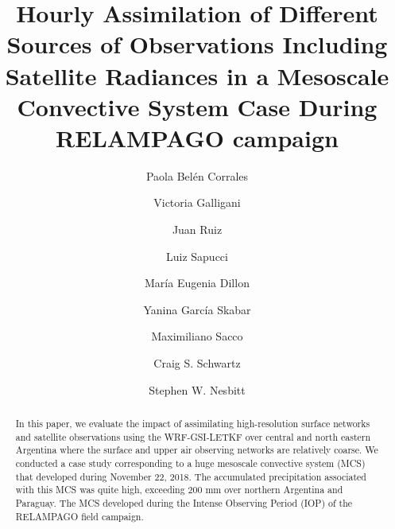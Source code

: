 \documentclass[final,5p,times,twocolumn,authoryear]{elsarticle} %
\begin{document}
\begin{frontmatter}

  \title{Hourly Assimilation of Different Sources of Observations Including Satellite Radiances in a Mesoscale Convective System Case During RELAMPAGO campaign}
    \author[UBA,CIMA,CNRS]{Paola Belén Corrales}
    \author[UBA,CIMA,CNRS]{Victoria Galligani}
  
    \author[UBA,CIMA,CNRS]{Juan Ruiz}
  
    \author[INPE]{Luiz Sapucci}
  
    \author[SMN,CONICET]{María Eugenia Dillon}
  
    \author[SMN,CONICET,CNRS]{Yanina García Skabar}
  
    \author[SMN]{Maximiliano Sacco}
  
    \author[NCAR]{Craig S. Schwartz}
  
    \author[Illinois]{Stephen W. Nesbitt}
  
      \address[UBA]{Universidad de Buenos Aires, Facultad de Ciencias Exactas y Naturales, Departamento de Ciencias de la Atmósfera y los Océanos. Buenos Aires, Argentina.}
    \address[CIMA]{CONICET -- Universidad de Buenos Aires. Centro de Investigaciones del Mar y la Atmósfera (CIMA). Buenos Aires, Argentina.}
    \address[CNRS]{CNRS -- IRD -- CONICET -- UBA. Instituto Franco-Argentino para el Estudio del Clima y sus Impactos (IRL 3351 IFAECI). Buenos Aires, Argentina.}
    \address[SMN]{Servicio Meteorológico Nacional de Argentina.}
    \address[CONICET]{CONICET (Consejo Nacional de Investigaciones Científicas y Técnicas).}
    \address[INPE]{National Institute for Space Research, Brazil, Center for Weather Forecasting and Climate Studies.}
    \address[NCAR]{National Center for Atmospheric Research, Boulder, Colorado.}
    \address[Illinois]{Department of Atmospheric Sciences, University of Illinois at Urbana--Champaign, Urbana, Illinois.}
  
  \begin{abstract}
  In this paper, we evaluate the impact of assimilating high-resolution surface networks and satellite observations using the WRF-GSI-LETKF over central and north eastern Argentina where the surface and upper air observing networks are relatively coarse. We conducted a case study corresponding to a huge mesoscale convective system (MCS) that developed during November 22, 2018. The accumulated precipitation associated with this MCS was quite high, exceeding 200 mm over northern Argentina and Paraguay. The MCS developed during the Intense Observing Period (IOP) of the RELAMPAGO field campaign.
  

\end{abstract}
\end{frontmatter}
\end{document}

